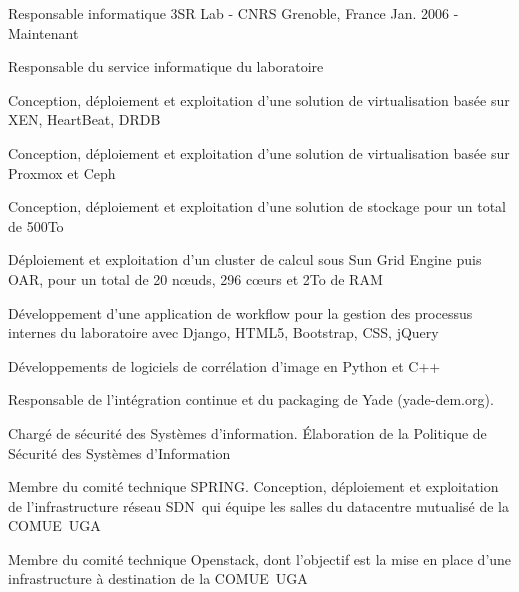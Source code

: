 

\begin{cventries}

  \cventry
    {Responsable informatique} %
    {3SR Lab - CNRS} %
    {Grenoble, France} %
    {Jan. 2006 - Maintenant} %
    {
      \begin{cvitems} %
        \item {Responsable du service informatique du laboratoire}
        \item {Conception, déploiement et exploitation d'une solution de virtualisation basée sur XEN, HeartBeat, DRDB}
        \item {Conception, déploiement et exploitation d'une solution de virtualisation basée sur Proxmox et Ceph}
        \item {Conception, déploiement et exploitation d'une solution de stockage pour un total de 500To}
        \item {Déploiement et exploitation d'un cluster de calcul sous Sun Grid Engine puis OAR, pour un total de 20 nœuds, 296 cœurs et 2To de RAM}
        \item {Développement d'une application de workflow pour la gestion des processus internes du laboratoire avec Django, HTML5, Bootstrap, CSS, jQuery}
        \item {Développements de logiciels de corrélation d'image en Python et C++}
        \item {Responsable de l'intégration continue et du packaging de Yade (yade-dem.org).}
        \item {Chargé de sécurité des Systèmes d'information. Élaboration de la Politique de Sécurité des Systèmes d'Information}
        \item {Membre du comité technique SPRING. Conception, déploiement et exploitation de l'infrastructure réseau SDN qui équipe les salles du datacentre mutualisé de la COMUE UGA}
        \item {Membre du comité technique Openstack, dont l'objectif est la mise en place d'une infrastructure à destination de la COMUE UGA}
      \end{cvitems}
    }


\end{cventries}
